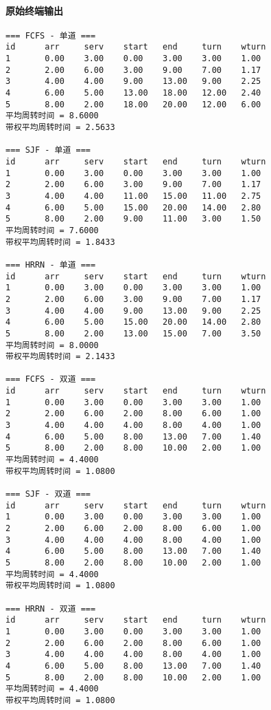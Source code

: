 \documentclass[12pt,hyperref,a4paper,UTF8]{ctexart}
\begin{document}
\paragraph{原始终端输出}
\begin{verbatim}
=== FCFS - 单道 ===
id      arr     serv    start   end     turn    wturn
1       0.00    3.00    0.00    3.00    3.00    1.00
2       2.00    6.00    3.00    9.00    7.00    1.17
3       4.00    4.00    9.00    13.00   9.00    2.25
4       6.00    5.00    13.00   18.00   12.00   2.40
5       8.00    2.00    18.00   20.00   12.00   6.00
平均周转时间 = 8.6000
带权平均周转时间 = 2.5633

=== SJF - 单道 ===
id      arr     serv    start   end     turn    wturn
1       0.00    3.00    0.00    3.00    3.00    1.00
2       2.00    6.00    3.00    9.00    7.00    1.17
3       4.00    4.00    11.00   15.00   11.00   2.75
4       6.00    5.00    15.00   20.00   14.00   2.80
5       8.00    2.00    9.00    11.00   3.00    1.50
平均周转时间 = 7.6000
带权平均周转时间 = 1.8433

=== HRRN - 单道 ===
id      arr     serv    start   end     turn    wturn
1       0.00    3.00    0.00    3.00    3.00    1.00
2       2.00    6.00    3.00    9.00    7.00    1.17
3       4.00    4.00    9.00    13.00   9.00    2.25
4       6.00    5.00    15.00   20.00   14.00   2.80
5       8.00    2.00    13.00   15.00   7.00    3.50
平均周转时间 = 8.0000
带权平均周转时间 = 2.1433

=== FCFS - 双道 ===
id      arr     serv    start   end     turn    wturn
1       0.00    3.00    0.00    3.00    3.00    1.00
2       2.00    6.00    2.00    8.00    6.00    1.00
3       4.00    4.00    4.00    8.00    4.00    1.00
4       6.00    5.00    8.00    13.00   7.00    1.40
5       8.00    2.00    8.00    10.00   2.00    1.00
平均周转时间 = 4.4000
带权平均周转时间 = 1.0800

=== SJF - 双道 ===
id      arr     serv    start   end     turn    wturn
1       0.00    3.00    0.00    3.00    3.00    1.00
2       2.00    6.00    2.00    8.00    6.00    1.00
3       4.00    4.00    4.00    8.00    4.00    1.00
4       6.00    5.00    8.00    13.00   7.00    1.40
5       8.00    2.00    8.00    10.00   2.00    1.00
平均周转时间 = 4.4000
带权平均周转时间 = 1.0800

=== HRRN - 双道 ===
id      arr     serv    start   end     turn    wturn
1       0.00    3.00    0.00    3.00    3.00    1.00
2       2.00    6.00    2.00    8.00    6.00    1.00
3       4.00    4.00    4.00    8.00    4.00    1.00
4       6.00    5.00    8.00    13.00   7.00    1.40
5       8.00    2.00    8.00    10.00   2.00    1.00
平均周转时间 = 4.4000
带权平均周转时间 = 1.0800


\end{verbatim}
\end{document}
